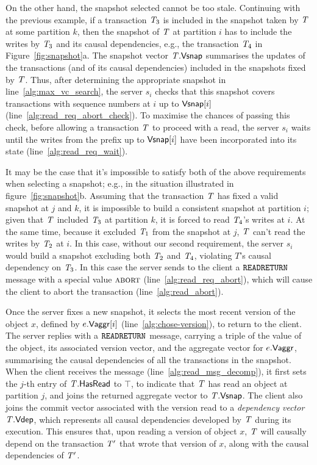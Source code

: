 On the other hand, the snapshot selected cannot be too stale. Continuing with the previous example, if a transaction $\mathit{T}_3$ is included in the snapshot taken by $\mathit{T}$ at some partition $k$, then the snapshot of $\mathit{T}$ at partition $i$ has to include the writes by $\mathit{T}_3$ and its causal dependencies, e.g., the transaction $\mathit{T}_4$ in Figure~\ref{fig:snapshot}a. The snapshot vector $\mathit{T}.\mathsf{Vsnap}$ summarises the updates of the transactions (and of its causal dependencies) included in the snapshots fixed by $\mathit{T}$. Thus, after determining the appropriate snapshot in line~\ref{alg:max_vc_search}, the server $s_i$ checks that this snapshot covers transactions with sequence numbers at $i$ up to $\mathsf{Vsnap}[i]$ (line~\ref{alg:read_req_abort_check}). To maximise the chances of passing this check, before allowing a transaction $\mathit{T}$ to proceed with a read, the server $s_i$ waits until the writes from the prefix up to $\mathsf{Vsnap}[i]$ have been incorporated into its state (line~\ref{alg:read_req_wait}).

It may be the case that it's impossible to satisfy both of the above requirements when selecting a snapshot; e.g., in the situation illustrated in figure~\ref{fig:snapshot}b. Assuming that the transaction $\mathit{T}$ has fixed a valid snapshot at $j$ and $k$, it is impossible to build a consistent snapshot at partition $i$; given that $\mathit{T}$ included $\mathit{T}_3$ at partition $k$, it is forced to read $\mathit{T}_4$'s writes at $i$. At the same time, because it excluded $\mathit{T}_1$ from the snapshot at $j$, $\mathit{T}$ can't read the writes by $\mathit{T}_2$ at $i$. In this case, without our second requirement, the server $s_i$ would build a snapshot excluding both $\mathit{T}_2$ and $\mathit{T}_4$, violating $T$'s causal dependency on $\mathit{T}_3$. In this case the server sends to the client a ${\tt READRETURN}$ message with a special value $\text{\sc abort}$ (line~\ref{alg:read_req_abort}), which will cause the client to abort the transaction (line~\ref{alg:read_abort}).

Once the server fixes a new snapshot, it selects the most recent version of the object $x$, defined by $e.\mathsf{Vaggr}[i]$ (line~\ref{alg:chose-version}), to return to the client. The server replies with a ${\tt READRETURN}$ message, carrying a triple of the value of the object, its associated version vector, and the aggregate vector for $e.\mathsf{Vaggr}$, summarising the causal dependencies of all the transactions in the snapshot. When the client receives the message (line~\ref{alg:read_msg_decomp}), it first sets the $j$-th entry of $\mathit{T}.\mathsf{HasRead}$ to $\top$, to indicate that $\mathit{T}$ has read an object at partition $j$, and joins the returned aggregate vector to $\mathit{T}.\mathsf{Vsnap}$. The client also joins the commit vector associated with the version read to a \emph{dependency vector} $\mathit{T}.\mathsf{Vdep}$, which represents all causal dependencies developed by $\mathit{T}$ during its execution. This ensures that, upon reading a version of object $x$, $\mathit{T}$ will causally depend on the transaction $\mathit{T}'$ that wrote that version of $x$, along with the causal dependencies of $\mathit{T}'$.

